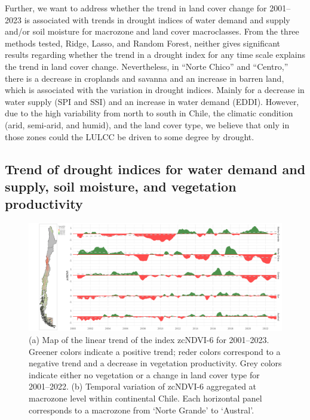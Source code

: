 \documentclass[
  number,
  preprint,
  3p,
  onecolumn]{elsarticle}
\begin{document}
Further, we want to address whether the trend in land cover change for
2001--2023 is associated with trends in drought indices of water demand
and supply and/or soil moisture for macrozone and land cover
macroclasses. From the three methods tested, Ridge, Lasso, and Random
Forest, neither gives significant results regarding whether the trend in
a drought index for any time scale explains the trend in land cover
change. Nevertheless, in ``Norte Chico'' and ``Centro,'' there is a
decrease in croplands and savanna and an increase in barren land, which
is associated with the variation in drought indices. Mainly for a
decrease in water supply (SPI and SSI) and an increase in water demand
(EDDI). However, due to the high variability from north to south in
Chile, the climatic condition (arid, semi-arid, and humid), and the land
cover type, we believe that only in those zones could the LULCC be
driven to some degree by drought.

\hypertarget{trend-of-drought-indices-for-water-demand-and-supply-soil-moisture-and-vegetation-productivity-1}{%
\subsection{Trend of drought indices for water demand and supply, soil
moisture, and vegetation
productivity}\label{trend-of-drought-indices-for-water-demand-and-supply-soil-moisture-and-vegetation-productivity-1}}

\begin{figure}[!ht]

{\centering \includegraphics{../output/figs/temporal_variation_zcNDVI6_macrozonas_con_mapa.png}

}

\caption{\label{fig-zcNDVI_var}(a) Map of the linear trend of the index
zcNDVI-6 for 2001--2023. Greener colors indicate a positive trend; reder
colors correspond to a negative trend and a decrease in vegetation
productivity. Grey colors indicate either no vegetation or a change in
land cover type for 2001--2022. (b) Temporal variation of zcNDVI-6
aggregated at macrozone level within continental Chile. Each horizontal
panel corresponds to a macrozone from `Norte Grande' to `Austral'.}

\end{figure}
\end{document}
